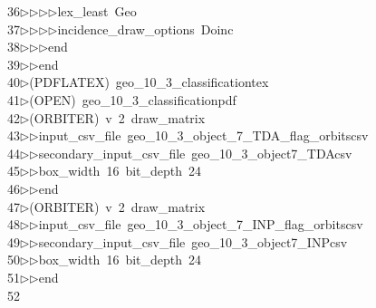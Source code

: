 \begin{tabbing}
36\>$\triangleright$\>$\triangleright$\>$\triangleright$\>$\triangleright$\>lex\_least\ Geo\ \\[0pt]
37\>$\triangleright$\>$\triangleright$\>$\triangleright$\>$\triangleright$\>incidence\_draw\_options\ Doinc\ \\[0pt]
38\>$\triangleright$\>$\triangleright$\>$\triangleright$\>end\ \\[0pt]
39\>$\triangleright$\>$\triangleright$\>end\\[0pt]
40\>$\triangleright$\>(PDFLATEX)\ geo\_10\_3\_classificationtex\\[0pt]
41\>$\triangleright$\>(OPEN)\ geo\_10\_3\_classificationpdf\\[0pt]
42\>$\triangleright$\>(ORBITER)\ v\ 2\ draw\_matrix\ \\[0pt]
43\>$\triangleright$\>$\triangleright$\>input\_csv\_file\ geo\_10\_3\_object\_7\_TDA\_flag\_orbitscsv\ \\[0pt]
44\>$\triangleright$\>$\triangleright$\>secondary\_input\_csv\_file\ geo\_10\_3\_object7\_TDAcsv\ \\[0pt]
45\>$\triangleright$\>$\triangleright$\>box\_width\ 16\ bit\_depth\ 24\ \\[0pt]
46\>$\triangleright$\>$\triangleright$\>end\\[0pt]
47\>$\triangleright$\>(ORBITER)\ v\ 2\ draw\_matrix\ \\[0pt]
48\>$\triangleright$\>$\triangleright$\>input\_csv\_file\ geo\_10\_3\_object\_7\_INP\_flag\_orbitscsv\ \\[0pt]
49\>$\triangleright$\>$\triangleright$\>secondary\_input\_csv\_file\ geo\_10\_3\_object7\_INPcsv\ \\[0pt]
50\>$\triangleright$\>$\triangleright$\>box\_width\ 16\ bit\_depth\ 24\ \\[0pt]
51\>$\triangleright$\>$\triangleright$\>end\\[0pt]
52\>\end{tabbing}
